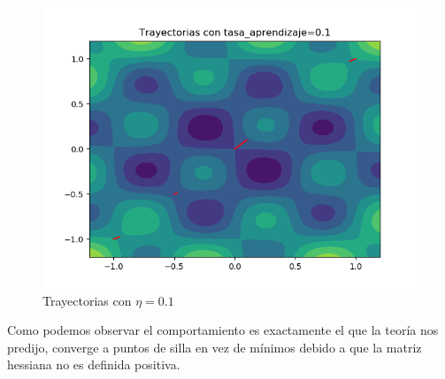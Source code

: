 \documentclass[12pt,a4paper]{article}
\begin{document}
\begin{figure}[H]
	\centering
	\includegraphics[scale=0.8]{./Imagenes/bonus13.png}
	\caption{Trayectorias con $\eta=0.1$}
\end{figure}

Como podemos observar el comportamiento es exactamente el que la teoría nos predijo, converge a puntos de silla en vez de mínimos debido a que la matriz hessiana no es definida positiva.
\end{document}
